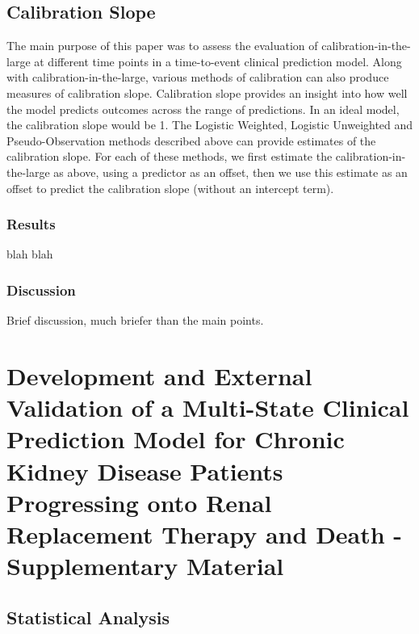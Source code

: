 \documentclass[12pt,PhD,twoside,openright]{muthesis}
\begin{document}
\hypertarget{calibration-slope}{%
\section{Calibration Slope}\label{calibration-slope}}

The main purpose of this paper was to assess the evaluation of calibration-in-the-large at different time points in a time-to-event clinical prediction model. Along with calibration-in-the-large, various methods of calibration can also produce measures of calibration slope. Calibration slope provides an insight into how well the model predicts outcomes across the range of predictions. In an ideal model, the calibration slope would be 1. The Logistic Weighted, Logistic Unweighted and Pseudo-Observation methods described above can provide estimates of the calibration slope. For each of these methods, we first estimate the calibration-in-the-large as above, using a predictor as an offset, then we use this estimate as an offset to predict the calibration slope (without an intercept term).

\hypertarget{results-6}{%
\subsection{Results}\label{results-6}}

blah blah

\hypertarget{discussion-5}{%
\subsection{Discussion}\label{discussion-5}}

Brief discussion, much briefer than the main points.

\hypertarget{chap-dev-paper-supp}{%
\chapter{Development and External Validation of a Multi-State Clinical Prediction Model for Chronic Kidney Disease Patients Progressing onto Renal Replacement Therapy and Death - Supplementary Material}\label{chap-dev-paper-supp}}


\hypertarget{statistical-analysis}{%
\section{Statistical Analysis}\label{statistical-analysis}}
\end{document}
